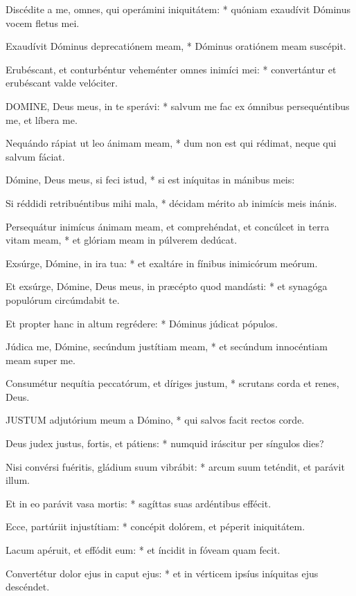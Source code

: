 Discédite a me, omnes, qui operámini iniquitátem: * quóniam exaudívit Dóminus vocem fletus mei.

Exaudívit Dóminus deprecatiónem meam, * Dóminus oratiónem meam suscépit.

Erubéscant, et conturbéntur veheménter omnes inimíci mei: * convertántur et erubéscant valde velóciter.


\lettrine[lines=2]{D}{OMINE}, Deus meus, in te sperávi: * salvum me fac ex ómnibus persequéntibus me, et líbera me.

Nequándo rápiat ut leo ánimam meam, * dum non est qui rédimat, neque qui salvum fáciat.

Dómine, Deus meus, si feci istud, * si est iníquitas in mánibus meis:

Si réddidi retribuéntibus mihi mala, * décidam mérito ab inimícis meis inánis.

Persequátur inimícus ánimam meam, et comprehéndat, et concúlcet in terra vitam meam, * et glóriam meam in púlverem dedúcat.

Exsúrge, Dómine, in ira tua: * et exaltáre in fínibus inimicórum meórum.

Et exsúrge, Dómine, Deus meus, in præcépto quod mandásti: * et synagóga populórum circúmdabit te.

Et propter hanc in altum regrédere: * Dóminus júdicat pópulos.

Júdica me, Dómine, secúndum justítiam meam, * et secúndum innocéntiam meam super me.

Consumétur nequítia peccatórum, et díriges justum, * scrutans corda et renes, Deus.


\lettrine[lines=2]{J}{USTUM} adjutórium meum a Dómino, * qui salvos facit rectos corde.

Deus judex justus, fortis, et pátiens: * numquid iráscitur per síngulos dies?

Nisi convérsi fuéritis, gládium suum vibrábit: * arcum suum teténdit, et parávit illum.

Et in eo parávit vasa mortis: * sagíttas suas ardéntibus effécit.

Ecce, partúriit injustítiam: * concépit dolórem, et péperit iniquitátem.

Lacum apéruit, et effódit eum: * et íncidit in fóveam quam fecit.

Convertétur dolor ejus in caput ejus: * et in vérticem ipsíus iníquitas ejus descéndet.

